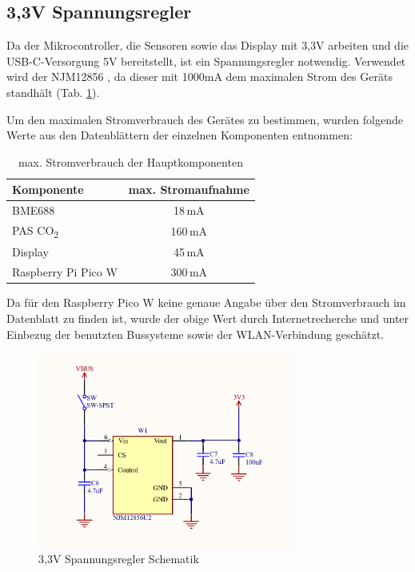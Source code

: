 \begin{inhalt}
      \section{3,3V Spannungsregler}

Da der Mikrocontroller, die Sensoren sowie das Display mit 3,3V arbeiten und die USB-C-Versorgung 5V bereitstellt, ist ein Spannungsregler notwendig. Verwendet wird der NJM12856 \cite{NJM12856}, da dieser mit 1000mA dem maximalen Strom des Geräts standhält (Tab. \ref{tab:Stromverbrauch}).

Um den maximalen Stromverbrauch des Gerätes zu bestimmen, wurden folgende Werte aus den Datenblättern der einzelnen Komponenten entnommen: 


\renewcommand{\arraystretch}{1.5}

\begin{table}[H]
\centering
{}
\begin{tabular}{|l|c|}
\hline
\rowcolor{cyan!20}
\textbf{Komponente} & \textbf{max. Stromaufnahme} \\
\hline
BME688 & 18\,mA \\
\hline
PAS CO\textsubscript{2} & 160\,mA \\
\hline
Display & 45\,mA \\
\hline
Raspberry Pi Pico W & 300\,mA \\
\hline
\end{tabular}
\caption{max. Stromverbrauch der Hauptkomponenten}
\label{tab:Stromverbrauch}
\end{table}

Da für den Raspberry Pico W keine genaue Angabe über den Stromverbrauch im Datenblatt zu finden ist, wurde der obige Wert durch Internetrecherche \cite{PicoWCurrent} und unter Einbezug der benutzten Bussysteme sowie der WLAN-Verbindung geschätzt.

\begin{figure}[!htb]
\centering
\includegraphics[width=0.75\textwidth]{files/Tobias/pics/Schaltungen/Schematik/3V3_Converter_Schematik.PNG}
\caption[3,3V Spannungsregler Schematik]{3,3V Spannungsregler Schematik}
\label{fig:3,3V Spannungsregler Schematik}
\end{figure}


\end{inhalt}
